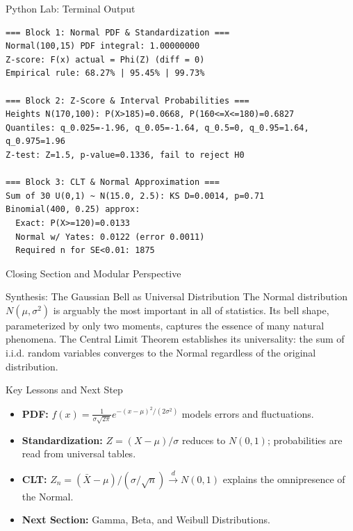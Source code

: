 \documentclass[aspectratio=169,xcolor={dvipsnames,table}]{beamer}
\begin{document}
\begin{frame}[fragile]{Python Lab: Terminal Output}
	\vspace{-0.1cm}
	\begin{block}{}
		\fontsize{4pt}{5pt}\selectfont
		\begin{verbatim}
=== Block 1: Normal PDF & Standardization ===
Normal(100,15) PDF integral: 1.00000000
Z-score: F(x) actual = Phi(Z) (diff = 0)
Empirical rule: 68.27% | 95.45% | 99.73%

=== Block 2: Z-Score & Interval Probabilities ===
Heights N(170,100): P(X>185)=0.0668, P(160<=X<=180)=0.6827
Quantiles: q_0.025=-1.96, q_0.05=-1.64, q_0.5=0, q_0.95=1.64, q_0.975=1.96
Z-test: Z=1.5, p-value=0.1336, fail to reject H0

=== Block 3: CLT & Normal Approximation ===
Sum of 30 U(0,1) ~ N(15.0, 2.5): KS D=0.0014, p=0.71
Binomial(400, 0.25) approx:
  Exact: P(X>=120)=0.0133
  Normal w/ Yates: 0.0122 (error 0.0011)
  Required n for SE<0.01: 1875
		\end{verbatim}
	\end{block}
\end{frame}









\begin{frame}{Closing Section and Modular Perspective}
	\vspace{-0.2cm}
	\begin{block}{Synthesis: The Gaussian Bell as Universal Distribution}
		\scriptsize
		The Normal distribution $N(\mu, \sigma^{2})$ is arguably the most important in all of statistics. Its bell shape, parameterized by only two moments, captures the essence of many natural phenomena. The Central Limit Theorem establishes its universality: the sum of i.i.d. random variables converges to the Normal regardless of the original distribution.
	\end{block}
	\vspace{0.05cm}
	\pause
	\begin{alertblock}{Key Lessons and Next Step}
		\begin{itemize}\itemsep=0.05cm
			\item \textbf{PDF:} $f(x) = \frac{1}{\sigma\sqrt{2\pi}} e^{-(x-\mu)^{2}/(2\sigma^{2})}$ models errors and fluctuations.
			\item \textbf{Standardization:} $Z = (X-\mu)/\sigma$ reduces to $N(0,1)$; probabilities are read from universal tables.
			\item \textbf{CLT:} $Z_{n} = (\bar{X}-\mu)/(\sigma/\sqrt{n}) \xrightarrow{d} N(0,1)$ explains the omnipresence of the Normal.
			\item \textbf{Next Section:} \textcolor{TecRojo}{Gamma, Beta, and Weibull Distributions}.
		\end{itemize}
	\end{alertblock}
\end{frame}
\end{document}
